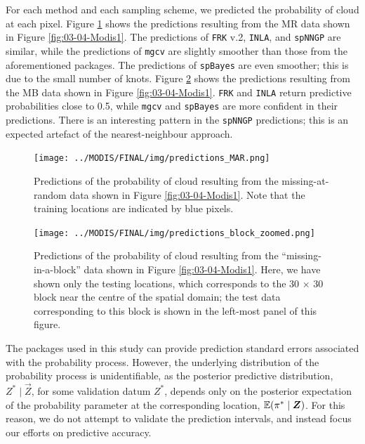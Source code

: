 \documentclass[12pt,a4paper]{article}
\begin{document}
 For each method and each sampling scheme, we predicted the probability of cloud at each pixel. 
 Figure \ref{fig:MODIS:pred_MR} shows the predictions resulting from the MR data shown in Figure \ref{fig:03-04-Modis1}. 
The predictions of \texttt{FRK} v.2, \texttt{INLA}, and \texttt{spNNGP} are similar, 
 while the predictions of \texttt{mgcv} are slightly smoother than those from the aforementioned packages.
 The predictions of \texttt{spBayes} are even smoother; this is due to the small number of knots. 
 Figure \ref{fig:MODIS:pred_block} shows the predictions resulting from the MB data shown in Figure \ref{fig:03-04-Modis1}. 
 \texttt{FRK} and \texttt{INLA} return predictive probabilities close to 0.5, while \texttt{mgcv} and \texttt{spBayes} are more confident in their predictions. 
 There is an interesting pattern in the \texttt{spNNGP} predictions; this is an expected artefact of the nearest-neighbour approach. 
 
 
 
 
\begin{figure}[t!]
    \centering
    \texttt{[image: ../MODIS/FINAL/img/predictions\_MAR.png]}
     \caption{Predictions of the probability of cloud resulting from the missing-at-random data shown in Figure \ref{fig:03-04-Modis1}. Note that the training locations are indicated by blue pixels.}   
  \label{fig:MODIS:pred_MR}
\end{figure}

\begin{figure}[t!]
    \centering
    \texttt{[image: ../MODIS/FINAL/img/predictions\_block\_zoomed.png]}
     \caption{Predictions of the probability of cloud resulting from the ``missing-in-a-block'' data shown in Figure \ref{fig:03-04-Modis1}. Here, we have shown only the testing locations, which corresponds to the 30 $\times$ 30 block near the centre of the spatial domain; the test data corresponding to this block is shown in the left-most panel of this figure.}   
  \label{fig:MODIS:pred_block}
\end{figure}






 
The packages used in this study can provide prediction standard errors associated with the probability process. 
However, the underlying distribution of the probability process is unidentifiable, as the posterior predictive distribution, ${Z^*} \mid \vec{Z}$, for some validation datum ${Z^*}$, depends only on the posterior expectation of the probability parameter at the corresponding location, $\ENoLR{\pi^* \mid \vec{Z}}$.
For this reason, we do not attempt to validate the prediction intervals, and instead focus our efforts on predictive accuracy.
\end{document}
